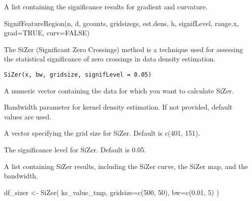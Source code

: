 \documentclass[a4paper]{book}
\begin{document}
%
\begin{Value}
A list containing the significance results for gradient and curvature.
\end{Value}
%
\begin{Examples}
\begin{ExampleCode}
SignifFeatureRegion(n, d, gcounts, gridsizegs, est.dens, h, signifLevel, range.x, grad=TRUE, curv=FALSE)
\end{ExampleCode}
\end{Examples}
%
\begin{Description}\relax
The SiZer (Significant Zero Crossings) method is a technique used for assessing the statistical significance of zero crossings in data density estimation.
\end{Description}
%
\begin{Usage}
\begin{verbatim}
SiZer(x, bw, gridsize, signifLevel = 0.05)
\end{verbatim}
\end{Usage}
%
\begin{Arguments}
\begin{ldescription}
\item[\code{x}] A numeric vector containing the data for which you want to calculate SiZer.

\item[\code{bw}] Bandwidth parameter for kernel density estimation. If not provided, default values are used.

\item[\code{gridsize}] A vector specifying the grid size for SiZer. Default is c(401, 151).

\item[\code{signifLevel}] The significance level for SiZer. Default is 0.05.
\end{ldescription}
\end{Arguments}
%
\begin{Value}
A list containing SiZer results, including the SiZer curve, the SiZer map, and the bandwidth.
\end{Value}
%
\begin{Examples}
\begin{ExampleCode}
df_sizer <- SiZer(
    ks_value_tmp,
    gridsize=c(500, 50),
    bw=c(0.01, 5)
)
\end{ExampleCode}
\end{Examples}
\end{document}
